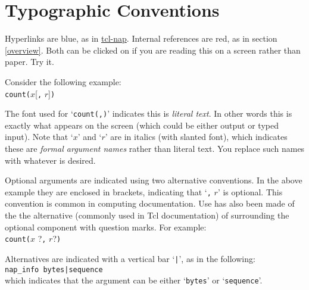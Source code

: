 
\section{Typographic Conventions}

Hyperlinks are blue, as in
\href{http://tcl-nap.sourceforge.net/index.php}{tcl-nap}.
Internal references are red, as in section \ref{overview}.
Both can be clicked on if you are reading this on a screen rather than paper.
Try it.

Consider the following example:
\\
\texttt{count(}$x$[\texttt{,} $r$]\texttt{)}

The font used for `\texttt{count(,)}' indicates this is 
    \textit{literal text}. In other words this is exactly what appears
    on the screen (which could be either output or typed input). Note
    that `$x$' 
    and `$r$' are in italics (with slanted font), which
    indicates these are 
    \textit{formal argument names} rather than literal text. You
    replace such names with whatever is desired.
    
 Optional arguments are indicated using two alternative
    conventions. In the above example they are enclosed in brackets,
    indicating that `\texttt{,} $r$' is optional. This convention is common in
    computing documentation. Use has also been made of the the
    alternative (commonly used in Tcl documentation) of surrounding the
    optional component with question marks. For example:
    \\
    \texttt{count(}$x$ ?\texttt{,} $r$?\texttt{)}
    
 Alternatives are indicated with a vertical bar `\texttt{|}', as
    in the following:
    \\
    \texttt{nap\_info bytes|sequence}
    \\
    which indicates that the argument can be either `\texttt{bytes}' or `\texttt{sequence}'.
